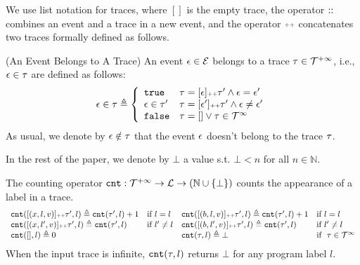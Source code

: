 We use list notation for traces, where $[]$ is the empty trace, the operator $\traceadd$ combines an event and a trace in a new event, 
and the operator ${\scriptscriptstyle ++}$ concatenates two traces formally defined as follows. 
\begin{defn}(An Event Belongs to A Trace)
  An event $\mathtt{\epsilon} \in \mathcal{E}$ belongs to a trace $\mathtt{\tau} \in \mathcal{T}^{+\infty}$, i.e., $\mathtt{\epsilon} \in \mathtt{\tau}$ are defined as follows:
%
\begin{equation*}
  \event \in \trace  
  \triangleq \left\{
  \begin{array}{ll} 
    \etrue                  & \trace =  [\event] \tracecat \trace'
     \land \event = \event' \\
    \event \in \trace' & \trace =  [\event'] \tracecat \trace'
      \land \event \neq \event' \\ 
    \efalse                 & \trace = [] \lor \trace \in \inftdom
  \end{array}
  \right.
\end{equation*}
As usual, we denote by $\mathtt{\epsilon} \notin \mathtt{\tau}$ that the event $\mathtt{\epsilon}$ doesn't belong to the trace $\mathtt{\tau}$.
\end{defn}
%
In the rest of the paper, we denote by $\bot$ a value s.t. $\bot < n $ for all $n \in \mathbb{N}$.
\begin{defn}
  \label{def:counter}
The counting operator $\mathtt{cnt} : \mathcal{T}^{+\infty} \to \mathcal{L} \to (\mathbb{N} \cup \{\bot\})$
counts the appearance of a label in a trace.
\[
\begin{array}{llll}
\mathtt{cnt}([(x, l, v)] {\scriptscriptstyle ++} \mathtt{\tau}', l ) \triangleq \mathtt{cnt}(\mathtt{\tau}', l) + 1 & \text{if}~ l = l
&
\mathtt{cnt}([(b, l, v)] {\scriptscriptstyle ++} \mathtt{\tau}', l) \triangleq \mathtt{cnt}(\mathtt{\tau}', l) + 1 & \text{if}~ l = l
\\
\mathtt{cnt}([(x, l', v)] {\scriptscriptstyle ++} \mathtt{\tau}', l) \triangleq \mathtt{cnt}(\mathtt{\tau}', l)   & \text{if}~ l' \neq l
&
\mathtt{cnt}([(b, l', v)] {\scriptscriptstyle ++} \mathtt{\tau}', l) \triangleq \mathtt{cnt}(\mathtt{\tau}', l)   & \text{if}~ l' \neq l
\\
\mathtt{cnt}({[]}, l) \triangleq 0 & 
&
\mathtt{cnt}(\mathtt{\tau}, l) \triangleq \bot & \text{if }~ \mathtt{\tau} \in \mathcal{T}^{\infty}
\end{array}
\]
{When the input trace is infinite, $\mathtt{cnt}(\mathtt{\tau}, l)$ returns $\bot$ for any program label $l$.}
\end{defn}
